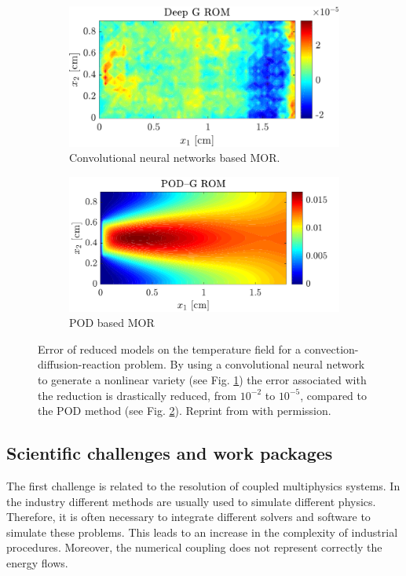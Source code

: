 \documentclass[12pt]{article}
\begin{document}
	\begin{figure}[t]
		\begin{subfigure}[t]{0.465\textwidth}
			\includegraphics[width=\columnwidth]{DGROM_T_param1.pdf} 
			\caption{Convolutional neural networks based MOR.}
			\label{fig:DG_ROM}
		\end{subfigure}\hfill
		\begin{subfigure}[t]{0.48\textwidth}
			\includegraphics[width=\columnwidth]{GROM_T_param1.pdf}%
			\caption{POD based MOR}
			\label{fig:POD_ROM}
		\end{subfigure}
		\caption[]{Error of reduced models on the temperature field for a convection-diffusion-reaction problem. By using a convolutional neural network to generate a nonlinear variety (see Fig. \ref{fig:DG_ROM}) the error associated with the reduction is drastically reduced, from $10^{-2}$ to $10^{-5}$, compared to the POD method (see Fig. \ref{fig:POD_ROM}). Reprint from \cite{lee2020} with permission.}%
		\label{fig:deepROM}%
	\end{figure}
	
	
	\subsection{Scientific challenges and work packages}
	The first challenge is related to the resolution of coupled multiphysics systems.  In the industry different methods are usually used to simulate different physics. Therefore, it is often necessary to integrate different solvers and software to simulate these problems. This leads to an increase in the complexity of industrial procedures. Moreover, the numerical coupling does not represent correctly the energy flows. \\
	
\end{document}
